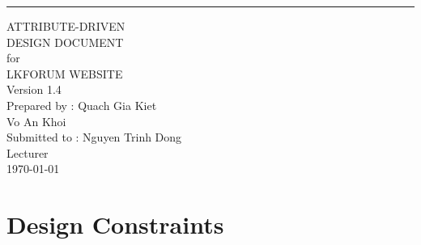 \documentclass{scrreprt}
\date{}
\def\myversion{1.4}
\begin{document}
\begin{flushright}
    \rule{16cm}{5pt}\vskip1cm
    \begin{bfseries}
        \Huge{ATTRIBUTE-DRIVEN \\ DESIGN DOCUMENT}\\
        \vspace{1.5cm}
        for\\
        \vspace{1.5cm}
        LKFORUM WEBSITE\\
        \vspace{1.5cm}
        \LARGE{Version \myversion}\\
        \vspace{1.5cm}
        Prepared by : Quach Gia Kiet\\
        Vo An Khoi\\
        \vspace{1.5cm}
        Submitted to : Nguyen Trinh Dong \\Lecturer\\
        \vspace{1.5cm}
        \today\\
    \end{bfseries}
\end{flushright}

\tableofcontents

\chapter{Design Constraints}
\end{document}
